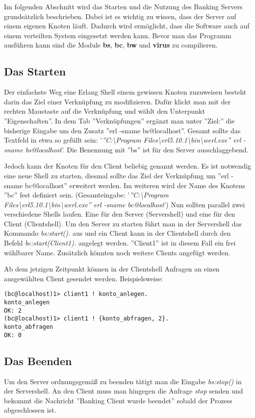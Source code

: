 Im folgenden Abschnitt wird das Starten und die Nutzung des Banking Servers grundsätzlich beschrieben. Dabei ist es wichtig zu wissen, dass der Server auf einem eigenen Knoten läuft. Dadurch wird ermöglicht, dass die Software auch auf einem verteilten System eingesetzt werden kann. Bevor man das Programm ausführen kann sind die Module \textbf{bs}, \textbf{bc}, \textbf{bw} und \textbf{virus} zu compilieren.

\subsection{Das Starten}

Der einfachste Weg eine Erlang Shell einem gewissen Knoten zuzuweisen besteht darin das Ziel einer Verknüpfung zu modifizieren. Dafür klickt man mit der rechten Maustaste auf die Verknüpfung und wählt den Unterpunkt ''Eigenschaften''.  In dem Tab ''Verknüpfungen'' ergänzt man unter ''Ziel:'' die bisherige Eingabe um den Zusatz ''erl -sname bs@localhost''. Gesamt sollte das Textfeld in etwa so gefüllt sein: '\textit{''C:\textbackslash Program Files\textbackslash erl5.10.1\textbackslash bin\textbackslash werl.exe'' erl -sname bs@localhost}'. Die Benennung mit ''bs'' ist für den Server ausschlaggebend.


Jedoch kann der Knoten für den Client beliebig genannt werden. Es ist notwendig eine neue Shell zu starten, diesmal sollte das Ziel der Verknüpfung um ''erl -sname bc@localhost'' erweitert werden. Im weiteren wird der Name des Knotens ''bc'' fest definiert sein. (Gesamteingabe: '\textit{''C:\textbackslash Program Files\textbackslash erl5.10.1\textbackslash bin\textbackslash werl.exe'' erl -sname bc@localhost}') Nun sollten parallel zwei verschiedene Shells laufen. Eine für den Server (Servershell) und eine für den Client (Clientshell). Um den Server zu starten führt man in der Servershell das Kommando \textit{bs:start().} aus und ein Client kann in der Clientshell durch den Befehl \textit{bc:start(Client1).} angelegt werden. ''Client1'' ist in diesem Fall ein frei wählbarer Name. Zusätzlich könnten noch weitere Clients angefügt werden.


Ab dem jetzigen Zeitpunkt können in der Clientshell Anfragen an einen ausgewählten Client gesendet werden. Beispielsweise:

\begin{lstlisting} 
(bc@localhost)1> client1 ! konto_anlegen.
konto_anlegen
OK: 2
(bc@localhost)1> client1 ! {konto_abfragen, 2}.
konto_abfragen
OK: 0
\end{lstlisting}

\subsection{Das Beenden}

Um den Server ordnungsgemäß zu beenden tätigt man die Eingabe \textit{bs:stop()} in der Servershell. An den Client muss man hingegen die Anfrage \textit{stop} senden und bekommt die Nachricht ''Banking Client wurde beendet'' sobald der Prozess abgeschlossen ist.
